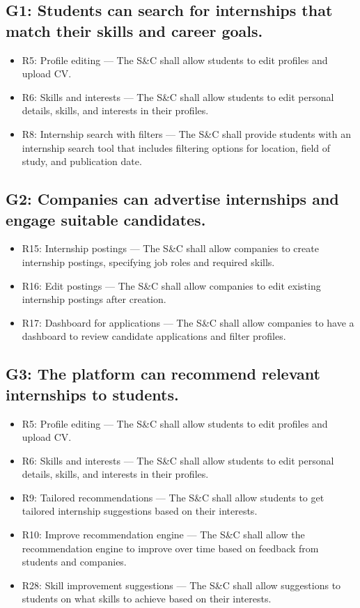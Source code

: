 \subsection{G1: Students can search for internships that match their skills and career goals.}
\begin{itemize}
    \item R5: Profile editing — The S\&C shall allow students to edit profiles and upload CV.
    \item R6: Skills and interests — The S\&C shall allow students to edit personal details, skills, and interests in their profiles.
    \item R8: Internship search with filters — The S\&C shall provide students with an internship search tool that includes filtering options for location, field of study, and publication date.
\end{itemize}

\subsection{G2: Companies can advertise internships and engage suitable candidates.}
\begin{itemize}
    \item R15: Internship postings — The S\&C shall allow companies to create internship postings, specifying job roles and required skills.
    \item R16: Edit postings — The S\&C shall allow companies to edit existing internship postings after creation.
    \item R17: Dashboard for applications — The S\&C shall allow companies to have a dashboard to review candidate applications and filter profiles.
\end{itemize}

\subsection{G3: The platform can recommend relevant internships to students.}
\begin{itemize}
    \item R5: Profile editing — The S\&C shall allow students to edit profiles and upload CV.
    \item R6: Skills and interests — The S\&C shall allow students to edit personal details, skills, and interests in their profiles.
    \item R9: Tailored recommendations — The S\&C shall allow students to get tailored internship suggestions based on their interests.
    \item R10: Improve recommendation engine — The S\&C shall allow the recommendation engine to improve over time based on feedback from students and companies.
    \item R28: Skill improvement suggestions — The S\&C shall allow suggestions to students on what skills to achieve based on their interests.
\end{itemize}

